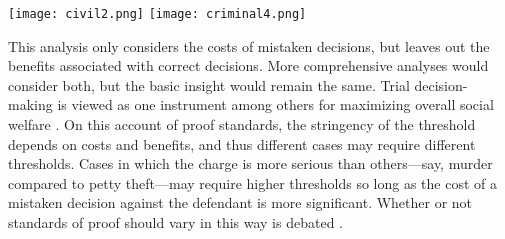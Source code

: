 \documentclass{article}
\begin{document}
\begin{center}
\texttt{[image: civil2.png]}
\texttt{[image: criminal4.png]}   
\end{center}






This analysis only considers the costs of mistaken decisions, but leaves out the benefits associated with correct decisions. More comprehensive analyses would consider both, but the basic insight would remain the same. Trial decision-making is viewed as one instrument among others  for maximizing overall social welfare \citep{Posner1973}. 
On this account of proof standards, the stringency of the threshold depends on costs and benefits, and thus different cases may require different thresholds. Cases in which the charge is more serious than others---say, murder compared to petty theft---may require higher thresholds so long as the cost of a mistaken decision against the defendant is more significant. %
Whether or not standards of proof should vary in this way is debated \citep{kaplow2012, picinali2013}.


















 
 




 
 












 
 







 

 
 
 


 
 
 
 
\end{document}
